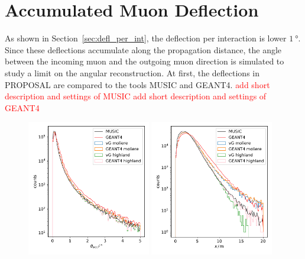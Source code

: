\section{Accumulated Muon Deflection}\label{sec:accum_defl}

As shown in Section~\ref{sec:defl_per_int}, the deflection per interaction 
is lower $\SI{1}{\degree}$. Since these deflections accumulate along the 
propagation distance, the angle between the incoming muon and the outgoing 
muon direction is simulated to study a limit on the angular reconstruction.
At first, the deflections in PROPOSAL are compared to 
the tools MUSIC and GEANT4.
\textcolor{red}{add short description and settings of MUSIC}
\textcolor{red}{add short description and settings of GEANT4}


\begin{figure}
    \centering
        {\includegraphics[width=0.48\textwidth]{figures/compare_MUSIC_angle_paper.pdf}}
        {\includegraphics[width=0.48\textwidth]{figures/compare_MUSIC_dist_paper.pdf}}

\end{figure}
